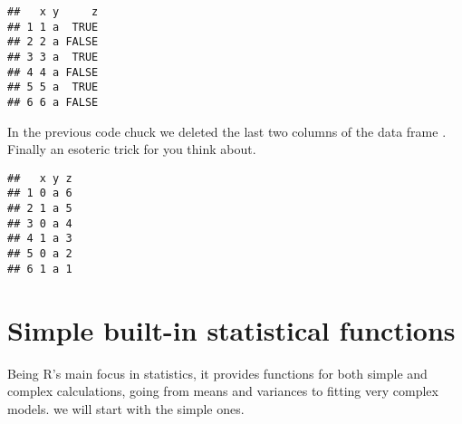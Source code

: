 \documentclass[paper=a4,10pt,div=17,headsepline,BCOR=12mm,twoside,open=right]{scrbook}\usepackage{knitr}
\begin{document}
\begin{knitrout}\footnotesize
{}\color{fgcolor}\begin{kframe}
\begin{alltt}
\hlstd{a.df[[}\hlstd{]]} \hlkwb{<-} 
\hlopt{$} \hlkwb{<-} 
\end{alltt}
\begin{verbatim}
##   x y     z
## 1 1 a  TRUE
## 2 2 a FALSE
## 3 3 a  TRUE
## 4 4 a FALSE
## 5 5 a  TRUE
## 6 6 a FALSE
\end{verbatim}
\end{kframe}
\end{knitrout}

In the previous code chuck we deleted the last two columns of the data frame .
Finally an esoteric trick for you think about.

\begin{knitrout}\footnotesize
{}\color{fgcolor}\begin{kframe}
\begin{alltt}
\hlstd{a.df[}\hlopt{:}\hlstd{,} \hlstd{(}\hlstd{,}\hlstd{)]} \hlkwb{<-} \hlstd{a.df[}\hlopt{:}\hlstd{,} \hlstd{(}\hlstd{,}\hlstd{)]}
\end{alltt}
\begin{verbatim}
##   x y z
## 1 0 a 6
## 2 1 a 5
## 3 0 a 4
## 4 1 a 3
## 5 0 a 2
## 6 1 a 1
\end{verbatim}
\end{kframe}
\end{knitrout}


\section{Simple built-in statistical functions}

Being R's main focus in statistics, it provides functions for both simple and complex calculations, going from means and variances to fitting very complex models. we will start with the simple ones.
\end{document}
